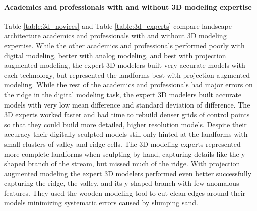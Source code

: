\paragraph{Academics and professionals with and without 3D modeling expertise}
%
Table \ref{table:3d_novices} and Table \ref{table:3d_experts}
compare landscape architecture academics and professionals 
with and without 3D modeling expertise. 
While the other academics and professionals
performed poorly with digital modeling, 
better with analog modeling, 
and best with projection augmented modeling,
the expert 3D modelers built very accurate models
with each technology, but represented the landforms
best with projection augmented modeling.
While the rest of the academics and professionals 
had major errors on the ridge 
in the digital modeling task,
the expert 3D modelers built accurate models 
with very low mean difference and 
standard deviation of difference. 
The 3D experts worked faster
and had time to rebuild denser grids of control points
so that they could build more detailed,
higher resolution models.
Despite their accuracy their digitally sculpted models 
still only hinted at the landforms 
with small clusters of valley and ridge cells. 
The 3D modeling experts represented 
more complete landforms when sculpting by hand,
capturing details like the y-shaped branch of the stream,
but missed much of the ridge. 
With projection augmented modeling 
the expert 3D modelers performed even better
successfully capturing
the ridge, the valley, and its y-shaped branch
with few anomalous features. 
%
They used the wooden modeling tool 
to cut clean edges around their models
minimizing systematic errors caused by slumping sand.
